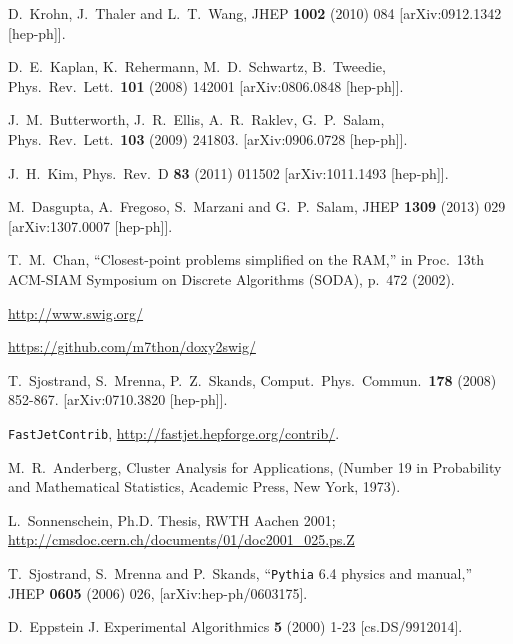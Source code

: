 \documentclass[12pt,a4]{article}
\newcommand{\fastjet}{\texttt{FastJet}\xspace}
\newcommand{\contrib}{\texttt{Contrib}\xspace}
\begin{document}
\begin{thebibliography}{99}
  D.~Krohn, J.~Thaler and L.~T.~Wang,
  JHEP {\bf 1002} (2010) 084
  [arXiv:0912.1342 [hep-ph]].

  D.~E.~Kaplan, K.~Rehermann, M.~D.~Schwartz, B.~Tweedie,
  Phys.\ Rev.\ Lett.\  {\bf 101 } (2008)  142001
  [arXiv:0806.0848 [hep-ph]].

  J.~M.~Butterworth, J.~R.~Ellis, A.~R.~Raklev, G.~P.~Salam,
  Phys.\ Rev.\ Lett.\  {\bf 103 } (2009)  241803.
  [arXiv:0906.0728 [hep-ph]].

  J.~H.~Kim,
  Phys.\ Rev.\  D {\bf 83} (2011) 011502
  [arXiv:1011.1493 [hep-ph]].


  M.~Dasgupta, A.~Fregoso, S.~Marzani and G.~P.~Salam,
  JHEP {\bf 1309} (2013) 029
  [arXiv:1307.0007 [hep-ph]].


  T.~M.~Chan,
  ``Closest-point problems simplified on the RAM,''
  in Proc.\ 13th ACM-SIAM Symposium on Discrete Algorithms (SODA),
  p.~472 (2002).

 \url{http://www.swig.org/}

 \url{https://github.com/m7thon/doxy2swig/}

  T.~Sjostrand, S.~Mrenna, P.~Z.~Skands,
  Comput.\ Phys.\ Commun.\  {\bf 178 } (2008)  852-867.
  [arXiv:0710.3820 [hep-ph]].

 \fastjet \contrib, \url{http://fastjet.hepforge.org/contrib/}.


  M.~R.~Anderberg, 
  Cluster Analysis for Applications,
  (Number 19 in Probability and Mathematical Statistics, Academic
  Press, New York, 1973).


  L.~Sonnenschein, Ph.D. Thesis, RWTH Aachen 2001; \\
  \url{http://cmsdoc.cern.ch/documents/01/doc2001_025.ps.Z}

  T.~Sjostrand, S.~Mrenna and P.~Skands,
  ``{\tt Pythia} 6.4 physics and manual,''
  JHEP {\bf 0605} (2006) 026,
  [arXiv:hep-ph/0603175].

  D.~Eppstein
  J. Experimental Algorithmics {\bf 5} (2000) 1-23 [cs.DS/9912014].
\end{thebibliography}
\end{document}
